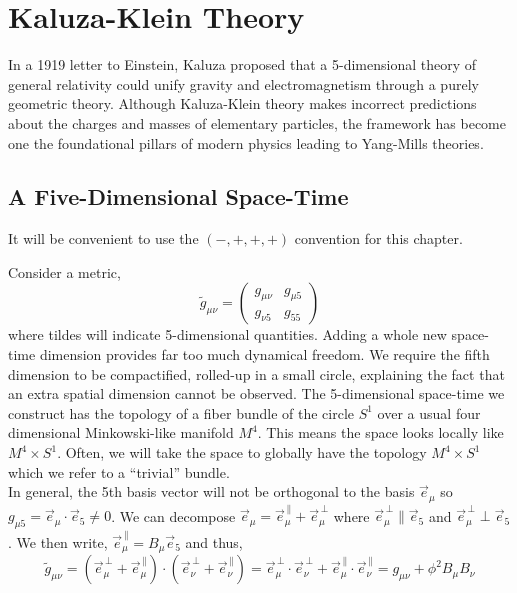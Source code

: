 \documentclass[11pt, a4paper]{article}
\begin{document}
\section{Kaluza-Klein Theory}

In a 1919 letter to Einstein, Kaluza proposed that a 5-dimensional theory of general relativity could unify gravity and electromagnetism through a purely geometric theory. Although Kaluza-Klein theory makes incorrect predictions about the charges and masses of elementary particles, the framework has become one the foundational pillars of modern physics leading to Yang-Mills theories. 

\subsection{A Five-Dimensional Space-Time}
\begin{remark}
It will be convenient to use the $(-, +, +, +)$ convention for this chapter.
\end{remark}
\noindent
Consider a metric,
\[ \tilde{g}_{\mu \nu} = \begin{pmatrix}
g_{\mu \nu} & g_{\mu 5} \\
g_{\nu 5} & g_{55}
\end{pmatrix}\]
where tildes will indicate 5-dimensional quantities. Adding a whole new space-time dimension provides far too much dynamical freedom. We require the fifth dimension to be compactified, rolled-up in a small circle, explaining the fact that an extra spatial dimension cannot be observed. The 5-dimensional space-time we construct has the topology of a fiber bundle of the circle $S^1$ over a usual four dimensional Minkowski-like manifold $M^4$. This means the space looks locally like $M^4 \times S^1$. Often, we will take the space to globally have the topology $M^4 \times S^1$ which we refer to a ``trivial'' bundle.
\bigskip\\
In general, the 5th basis vector will not be orthogonal to the basis $\vec{e}_\mu$ so $g_{\mu 5} = \vec{e}_\mu \cdot \vec{e}_5 \neq 0$. We can decompose $\vec{e}_\mu = \vec{e}_{\mu}^{\, \parallel} + \vec{e}_\mu^{\, \perp}$ where $\vec{e}_{\mu}^{\, \perp} \parallel \vec{e}_5$ and $\vec{e}_{\mu}^{\, \perp} \perp \vec{e}_5$. We then write, $\vec{e}_{\mu}^{\, \parallel} = B_\mu \vec{e}_5$ and thus,
\[ \tilde{g}_{\mu \nu} =  (\vec{e}_{\mu}^{\, \perp} + \vec{e}_\mu^{\, \parallel}) \cdot (\vec{e}_{\nu}^{\, \perp} + \vec{e}_\nu^{\, \parallel}) = \vec{e}_{\mu}^{\, \perp} \cdot \vec{e}_{\nu}^{\, \perp} + \vec{e}_\mu^{\, \parallel} \cdot \vec{e}_{\nu}^{\, \parallel} = g_{\mu \nu} + \phi^2 B_\mu B_\nu \]
\end{document}
